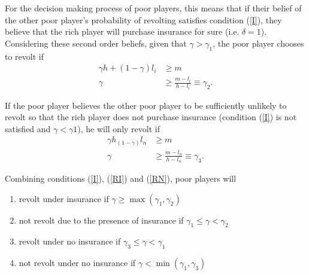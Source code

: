 \documentclass[12pt]{article}
\begin{document}
	For the decision making process of poor players, this means that if their 
	belief of the other poor player's probability of revolting satisfies 
	condition (\ref{I}), they believe that the rich player will purchase 
	insurance for sure (i.e. $\delta=1$). Considering these second order 
	beliefs, given that $\gamma>\gamma_1$, the poor player chooses to revolt if
	\begin{align*}
		\gamma h + (1-\gamma)l_i &\geq m\\
		\gamma &\geq \frac{m-l_i}{h-l_i} \equiv \gamma_2. \tag{RI}\label{RI}
	\end{align*}
	
	If the poor player believes the other poor player to be sufficiently 
	unlikely to revolt so that the rich player does not purchase insurance 
	(condition (\ref{I}) is not satisfied and $\gamma<\gamma1$), he will only 
	revolt if
	\begin{align*}
		\gamma h _ (1-\gamma)l_n &\geq m\\
		\gamma &\geq \frac{m-l_n}{h-l_n} \equiv \gamma_3. \tag{RN}\label{RN}
	\end{align*}
	
	Combining conditions (\ref{I}), (\ref{RI}) and (\ref{RN}), poor players will
	\begin{enumerate}
		\item revolt under insurance if $\gamma \geq \max (\gamma_1, \gamma_2)$
		\item not revolt due to the presence of insurance if $\gamma_1 \leq 
		\gamma < \gamma_2$
		\item revolt under no insurance if $\gamma_3 \leq \gamma < \gamma_1$
		\item not revolt under no insurance if $\gamma < \min (\gamma_1, 
		\gamma_3)$
	\end{enumerate}
	
\end{document}
